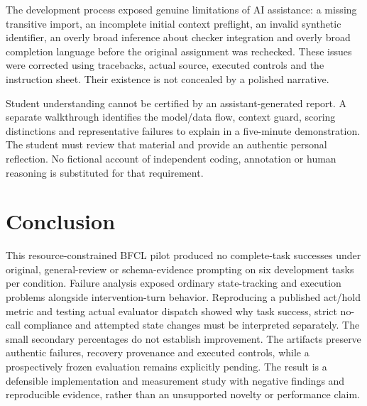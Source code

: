 \documentclass[conference]{IEEEtran}
\begin{document}
The development process exposed genuine limitations of AI assistance: a missing transitive import, an incomplete initial context preflight, an invalid synthetic identifier, an overly broad inference about checker integration and overly broad completion language before the original assignment was rechecked. These issues were corrected using tracebacks, actual source, executed controls and the instruction sheet. Their existence is not concealed by a polished narrative.

Student understanding cannot be certified by an assistant-generated report. A separate walkthrough identifies the model/data flow, context guard, scoring distinctions and representative failures to explain in a five-minute demonstration. The student must review that material and provide an authentic personal reflection. No fictional account of independent coding, annotation or human reasoning is substituted for that requirement.

\section{Conclusion}
This resource-constrained BFCL pilot produced no complete-task successes under original, general-review or schema-evidence prompting on six development tasks per condition. Failure analysis exposed ordinary state-tracking and execution problems alongside intervention-turn behavior. Reproducing a published act/hold metric and testing actual evaluator dispatch showed why task success, strict no-call compliance and attempted state changes must be interpreted separately. The small secondary percentages do not establish improvement. The artifacts preserve authentic failures, recovery provenance and executed controls, while a prospectively frozen evaluation remains explicitly pending. The result is a defensible implementation and measurement study with negative findings and reproducible evidence, rather than an unsupported novelty or performance claim.

\balance


\end{document}
